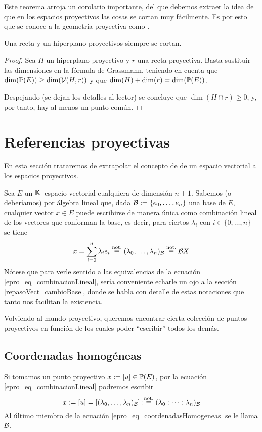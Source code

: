 Este teorema arroja un corolario importante, del que debemos extraer la idea de que en los espacios proyectivos las cosas se cortan muy fácilmente. Es por esto que se conoce a la geometría proyectiva como .
\begin{cor}
	Una recta y un hiperplano proyectivos siempre se cortan.
\end{cor}
\begin{proof}
	Sea $H$ un hiperplano proyectivo y $r$ una recta proyectiva. Basta sustituir las dimensiones en la fórmula de Grassmann, teniendo en cuenta que $\dim(\mathbb{P}(E))\geq\dim(\mathcal{V}(H,r))$ y que $\dim(H)+\dim(r)=\dim(\mathbb{P}(E))$.
	
	Despejando (se dejan los detalles al lector) se concluye que $\dim(H\cap r)\geq 0$, y, por tanto, hay al menos un punto común.
\end{proof}
\section{Referencias proyectivas}
En esta sección trataremos de extrapolar el concepto de  de un espacio vectorial a los espacios proyectivos.

Sea $E$ un $\mathbb{K}$--espacio vectorial cualquiera de dimensión $n+1$. Sabemos (o deberíamos) por álgebra lineal que, dada $\mathcal{B}:=\{e_0,\dots,e_n\}$ una base de $E$, cualquier vector $x\in E$ puede escribirse de manera única como combinación lineal de los vectores que conforman la base, es decir, para ciertos $\lambda_i$ con $i\in\{0,\dots,n\}$ se tiene
\begin{equation}
\label{epro_eq_combinacionLineal}
x=\sum_{i=0}^{n}\lambda_ie_i\stackrel{\textrm{not.}}{\equiv}(\lambda_0,\dots,\lambda_n)_{\mathcal{B}}\stackrel{\textrm{not.}}{\equiv}\mathcal{B}X
\end{equation}
Nótese que para verle sentido a las equivalencias de la ecuación \eqref{epro_eq_combinacionLineal}, sería conveniente echarle un ojo a la sección \ref{repasoVect_cambioBase}, donde se habla con detalle de estas notaciones que tanto nos facilitan la existencia.

Volviendo al mundo proyectivo, queremos encontrar cierta colección de puntos proyectivos en función de los cuales poder ``escribir'' todos los demás. 
\subsection{Coordenadas homogéneas}
\label{epro_coordenadasHomogeneas}
Si tomamos un punto proyectivo $x:=\left [ u \right ]\in\mathbb{P}(E)$, por la ecuación \eqref{epro_eq_combinacionLineal} podremos escribir
\begin{equation}
	\label{epro_eq_coordenadasHomogeneas}
	x:=\left [ u \right ]=\left [ (\lambda_0,\dots,\lambda_n)_{\mathcal{B}} \right ]:\stackrel{\textrm{not.}}{\equiv}(\lambda_0:\dots:\lambda_n)_{\mathcal{B}}
\end{equation}
Al último miembro de la ecuación \eqref{epro_eq_coordenadasHomogeneas} se le llama    $\mathcal{B}$.

